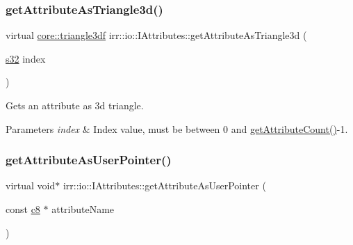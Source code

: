 \subsubsection{\texorpdfstring{get\+Attribute\+As\+Triangle3d()}{getAttributeAsTriangle3d()}\hspace{0.1cm}{\footnotesize\ttfamily [4/4]}}
{\footnotesize\ttfamily virtual \hyperlink{namespaceirr_1_1core_a8983bda2678a7a67d97bf3c7be6c31c7}{core\+::triangle3df} irr\+::io\+::\+I\+Attributes\+::get\+Attribute\+As\+Triangle3d (\begin{DoxyParamCaption}\item[{\hyperlink{namespaceirr_ac66849b7a6ed16e30ebede579f9b47c6}{s32}}]{index }\end{DoxyParamCaption})\hspace{0.3cm}{\ttfamily [pure virtual]}}



Gets an attribute as 3d triangle. 


\begin{DoxyParams}{Parameters}
{\em index} & Index value, must be between 0 and \hyperlink{classirr_1_1io_1_1IAttributes_a796bdd9440ee7ba0b6742a90a82870b6}{get\+Attribute\+Count()}-\/1. \\
\hline
\end{DoxyParams}
\mbox{\label{classirr_1_1io_1_1IAttributes_a6f97e7af81f611bd13ced0378531ed2d}} 
\subsubsection{\texorpdfstring{get\+Attribute\+As\+User\+Pointer()}{getAttributeAsUserPointer()}\hspace{0.1cm}{\footnotesize\ttfamily [1/4]}}
{\footnotesize\ttfamily virtual void$\ast$ irr\+::io\+::\+I\+Attributes\+::get\+Attribute\+As\+User\+Pointer (\begin{DoxyParamCaption}\item[{const \hyperlink{namespaceirr_a9395eaea339bcb546b319e9c96bf7410}{c8} $\ast$}]{attribute\+Name }\end{DoxyParamCaption})\hspace{0.3cm}{\ttfamily [pure virtual]}}



